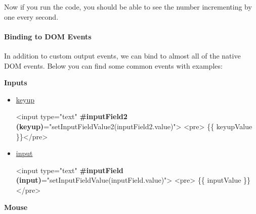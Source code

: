 \documentclass[12pt,]{article}
\newenvironment{Shaded}{}{}
\newcommand{\KeywordTok}[1]{\textcolor[rgb]{0.00,0.00,1.00}{{#1}}}
\newcommand{\StringTok}[1]{\textcolor[rgb]{0.00,0.50,0.50}{{#1}}}
\newcommand{\OtherTok}[1]{\textcolor[rgb]{1.00,0.25,0.00}{{#1}}}
\newcommand{\ErrorTok}[1]{\textcolor[rgb]{1.00,0.00,0.00}{\textbf{{#1}}}}
\newcommand{\NormalTok}[1]{{#1}}
\let\oldparagraph\paragraph
\renewcommand{\paragraph}[1]{\oldparagraph{#1}\mbox{}}
\begin{document}
Now if you run the code, you should be able to see the number
incrementing by one every second.

\paragraph{Binding to DOM Events}\label{binding-to-dom-events}

In addition to custom output events, we can bind to almost all of the
native DOM events. Below you can find some common events with examples:

\textbf{Inputs}

\begin{itemize}
\item
  \href{https://developer.mozilla.org/en-US/docs/Web/Events/keyup}{keyup}

\begin{Shaded}
\begin{Highlighting}[numbers=left,,]
\KeywordTok{<input}\OtherTok{ type=}\StringTok{"text"} \ErrorTok{#inputField2} \ErrorTok{(keyup)}\OtherTok{=}\StringTok{"setInputFieldValue2(inputField2.value)"}\KeywordTok{>}
\KeywordTok{<pre>} \NormalTok{\{\{ keyupValue \}\}}\KeywordTok{</pre>}
\end{Highlighting}
\end{Shaded}
\item
  \href{https://developer.mozilla.org/en-US/docs/Web/Events/input}{input}

\begin{Shaded}
\begin{Highlighting}[numbers=left,,]
\KeywordTok{<input}\OtherTok{ type=}\StringTok{"text"} \ErrorTok{#inputField} \ErrorTok{(input)}\OtherTok{=}\StringTok{"setInputFieldValue(inputField.value)"}\KeywordTok{>}
\KeywordTok{<pre>} \NormalTok{\{\{ inputValue \}\}}\KeywordTok{</pre>}
\end{Highlighting}
\end{Shaded}
\end{itemize}

\textbf{Mouse}
\end{document}
